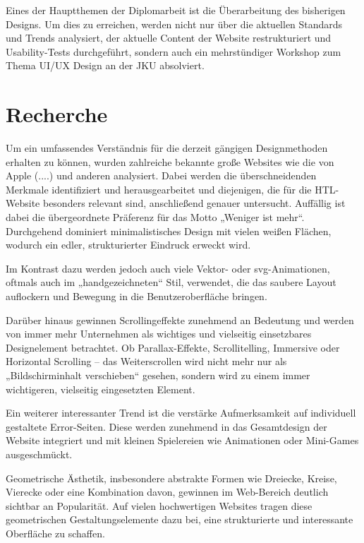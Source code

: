 Eines der Hauptthemen der Diplomarbeit ist die Überarbeitung des bisherigen Designs. 
Um dies zu erreichen, werden nicht nur über die aktuellen Standards und Trends analysiert, 
der aktuelle Content der Website restrukturiert und Usability-Tests durchgeführt, 
sondern auch ein mehrstündiger Workshop zum Thema UI/UX Design an der JKU absolviert.

\section{Recherche} \label{sec:Recherche}
Um ein umfassendes Verständnis für die derzeit gängigen Designmethoden erhalten zu können, wurden zahlreiche bekannte große Websites wie die von Apple (....) und anderen analysiert.
Dabei werden die überschneidenden Merkmale identifiziert und herausgearbeitet und diejenigen, die für die HTL-Website besonders relevant sind, anschließend genauer untersucht. 
Auffällig ist dabei die übergeordnete Präferenz für das Motto „Weniger ist mehr“. Durchgehend dominiert minimalistisches Design mit vielen weißen Flächen, wodurch ein edler, strukturierter Eindruck erweckt wird.

Im Kontrast dazu werden jedoch auch viele Vektor- oder svg-Animationen, oftmals auch im „handgezeichneten“ Stil, verwendet, die das saubere Layout auflockern und Bewegung in die Benutzeroberfläche bringen. 

Darüber hinaus gewinnen Scrollingeffekte zunehmend an Bedeutung und werden von immer mehr Unternehmen als wichtiges und vielseitig einsetzbares Designelement betrachtet. 
Ob Parallax-Effekte, Scrollitelling, Immersive oder Horizontal Scrolling – das Weiterscrollen wird nicht mehr nur als „Bildschirminhalt verschieben“ gesehen, 
sondern wird zu einem immer wichtigeren, vielseitig eingesetzten Element. 

Ein weiterer interessanter Trend ist die verstärke Aufmerksamkeit auf individuell gestaltete
Error-Seiten. Diese werden zunehmend in das Gesamtdesign der Website integriert und mit kleinen 
Spielereien wie Animationen oder Mini-Games ausgeschmückt. 

Geometrische Ästhetik, insbesondere abstrakte Formen wie Dreiecke, 
Kreise, Vierecke oder eine Kombination davon, gewinnen im Web-Bereich deutlich sichtbar an Popularität. 
Auf vielen hochwertigen Websites tragen diese geometrischen Gestaltungselemente dazu bei, eine strukturierte und interessante Oberfläche zu schaffen. 


